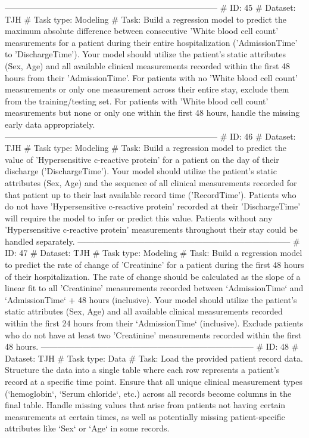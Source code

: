 \begin{tcolorbox}[colback=cadmiumgreen!5!white,colframe=forestgreen!75!white,breakable,title=\textit{Generated analytical tasks in task 4.}]
\begin{VerbatimWrap}
-----------------------------------------------------------------------------
# ID: 45  
# Dataset: TJH 
# Task type: Modeling
# Task: Build a regression model to predict the maximum absolute difference between consecutive 'White blood cell count' measurements for a patient during their entire hospitalization ('AdmissionTime' to 'DischargeTime'). Your model should utilize the patient's static attributes (Sex, Age) and all available clinical measurements recorded within the first 48 hours from their 'AdmissionTime'. For patients with no 'White blood cell count' measurements or only one measurement across their entire stay, exclude them from the training/testing set. For patients with 'White blood cell count' measurements but none or only one within the first 48 hours, handle the missing early data appropriately.
-----------------------------------------------------------------------------
# ID: 46  
# Dataset: TJH 
# Task type: Modeling
# Task: Build a regression model to predict the value of 'Hypersensitive c-reactive protein' for a patient on the day of their discharge ('DischargeTime'). Your model should utilize the patient's static attributes (Sex, Age) and the sequence of all clinical measurements recorded for that patient up to their last available record time ('RecordTime'). Patients who do not have 'Hypersensitive c-reactive protein' recorded at their 'DischargeTime' will require the model to infer or predict this value. Patients without any 'Hypersensitive c-reactive protein' measurements throughout their stay could be handled separately.
-----------------------------------------------------------------------------
# ID: 47  
# Dataset: TJH 
# Task type: Modeling
# Task: Build a regression model to predict the rate of change of 'Creatinine' for a patient during the first 48 hours of their hospitalization. The rate of change should be calculated as the slope of a linear fit to all 'Creatinine' measurements recorded between `AdmissionTime` and `AdmissionTime` + 48 hours (inclusive). Your model should utilize the patient's static attributes (Sex, Age) and all available clinical measurements recorded within the first 24 hours from their `AdmissionTime` (inclusive). Exclude patients who do not have at least two 'Creatinine' measurements recorded within the first 48 hours.
-----------------------------------------------------------------------------
# ID: 48  
# Dataset: TJH 
# Task type: Data
# Task: Load the provided patient record data. Structure the data into a single table where each row represents a patient's record at a specific time point. Ensure that all unique clinical measurement types (`hemoglobin`, `Serum chloride`, etc.) across all records become columns in the final table. Handle missing values that arise from patients not having certain measurements at certain times, as well as potentially missing patient-specific attributes like `Sex` or `Age` in some records. 

\end{VerbatimWrap}
\end{tcolorbox}
